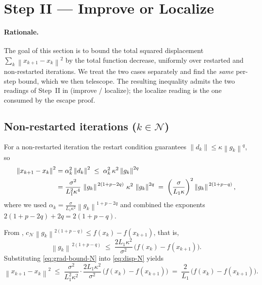 \documentclass[11pt,a4paper]{article}
\theoremstyle{plain}
\theoremstyle{definition}
\newcommand{\norm}[1]{\left\|#1\right\|}
\newcommand{\Lone}{L_{1}}
\newcommand{\setN}{\mathcal{N}}
\newcommand{\cN}{c_{\setN}}
\begin{document}
\section{Step II --- Improve or Localize}\label{sec:improve}

\paragraph{Rationale.}
The goal of this section is to bound the total squared displacement
$\sum_{k} \norm{x_{k+1} - x_{k}}^{2}$ by the total function decrease, uniformly over
restarted and non-restarted iterations. We treat the two cases separately and find the
\emph{same} per-step bound, which we then telescope. The resulting inequality admits
the two readings of Step~II in  (improve / localize); the localize
reading is the one consumed by the escape proof.

\subsection{Non-restarted iterations ($k \in \setN$)}\label{sub:improveN}
For a non-restarted iteration the restart condition guarantees
$\norm{d_{k}} \leq \kappa \norm{g_{k}}^{q}$, so
\begin{align}
\norm{x_{k+1} - x_{k}}^{2}
  &= \alpha_{k}^{2} \norm{d_{k}}^{2}
   \;\leq\; \alpha_{k}^{2}\, \kappa^{2} \norm{g_{k}}^{2q} \notag\\
  &= \frac{\sigma^{2}}{\Lone^{2}\kappa^{4}}\,
     \norm{g_{k}}^{\,2(1+p-2q)}\, \kappa^{2}\, \norm{g_{k}}^{2q}
   \;=\; \left(\frac{\sigma}{\Lone\kappa}\right)^{2}
        \norm{g_{k}}^{\,2(1+p-q)} ,
\label{eq:disp-N}
\end{align}
where we used $\alpha_{k} = \tfrac{\sigma}{\Lone\kappa^{2}}\norm{g_{k}}^{1+p-2q}$ and
combined the exponents $2(1+p-2q) + 2q = 2(1+p-q)$.

From , $\cN \norm{g_{k}}^{2(1+p-q)} \leq f(x_{k}) - f(x_{k+1})$,
that is,
\begin{equation}\label{eq:grad-bound-N}
\norm{g_{k}}^{\,2(1+p-q)}
  \;\leq\; \frac{2\Lone\kappa^{2}}{\sigma^{2}}\,
           \big(f(x_{k}) - f(x_{k+1})\big) .
\end{equation}
Substituting \eqref{eq:grad-bound-N} into \eqref{eq:disp-N} yields
\begin{equation}\label{eq:disp-N-final}
\norm{x_{k+1} - x_{k}}^{2}
  \;\leq\; \frac{\sigma^{2}}{\Lone^{2}\kappa^{2}}
           \cdot \frac{2\Lone\kappa^{2}}{\sigma^{2}}\,
           \big(f(x_{k}) - f(x_{k+1})\big)
  \;=\; \frac{2}{\Lone}\,\big(f(x_{k}) - f(x_{k+1})\big) .
\end{equation}
\end{document}
